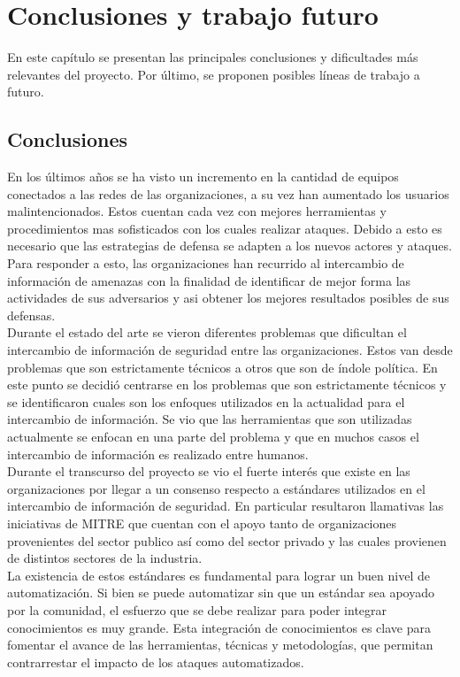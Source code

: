 \chapter{Conclusiones y trabajo futuro}
\label{capitulo7}

En este capítulo se presentan las principales conclusiones y dificultades más relevantes del proyecto. Por último, se proponen posibles líneas de trabajo a futuro.

\section{Conclusiones}

En los últimos años se ha visto un incremento en la cantidad de equipos conectados a las redes de las organizaciones, a su vez han aumentado los usuarios malintencionados. Estos cuentan cada vez con mejores herramientas y procedimientos mas sofisticados con los cuales realizar ataques. Debido a esto es necesario que las estrategias de defensa se adapten a los nuevos actores y ataques. Para responder a esto, las organizaciones han recurrido al intercambio de información de amenazas con la finalidad de identificar de mejor forma las actividades de sus adversarios y asi obtener los mejores resultados posibles de sus defensas.\\
\bigskip
Durante el estado del arte se vieron diferentes problemas que dificultan el intercambio de información de seguridad entre las organizaciones. Estos van desde problemas que son estrictamente técnicos a otros que son de índole política. En este punto se decidió centrarse en los problemas que son estrictamente técnicos y se identificaron cuales son los enfoques utilizados en la actualidad para el intercambio de información. Se vio que las  herramientas que son utilizadas actualmente se enfocan en una parte del problema y que en muchos casos el intercambio de información es realizado entre humanos.  \\
\bigskip
Durante el transcurso del proyecto se vio el fuerte interés que existe en las organizaciones por llegar a un consenso respecto a estándares utilizados en el intercambio de información de seguridad. En particular resultaron llamativas las iniciativas de MITRE que cuentan con el apoyo tanto de organizaciones provenientes del sector publico así como del sector privado y las cuales provienen de distintos sectores de la industria.\\   
\bigskip
La existencia de estos estándares es fundamental para lograr un buen nivel de automatización. Si bien se puede automatizar sin que un estándar sea apoyado por la comunidad, el esfuerzo que se debe realizar para poder integrar conocimientos es muy grande. Esta integración de conocimientos es clave para fomentar el avance de las herramientas, técnicas y metodologías, que permitan contrarrestar el impacto de los ataques automatizados.\\
